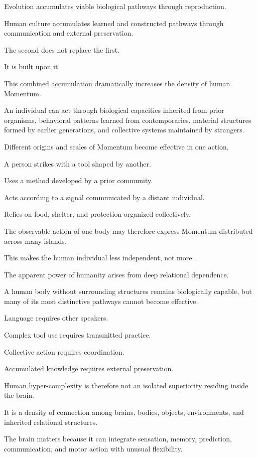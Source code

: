 Evolution accumulates viable biological pathways through reproduction.

Human culture accumulates learned and constructed pathways through communication and external preservation.

The second does not replace the first.

It is built upon it.

This combined accumulation dramatically increases the density of human Momentum.

An individual can act through biological capacities inherited from prior organisms, behavioral patterns learned from contemporaries, material structures formed by earlier generations, and collective systems maintained by strangers.

Different origins and scales of Momentum become effective in one action.

A person strikes with a tool shaped by another.

Uses a method developed by a prior community.

Acts according to a signal communicated by a distant individual.

Relies on food, shelter, and protection organized collectively.

The observable action of one body may therefore express Momentum distributed across many islands.

This makes the human individual less independent, not more.

The apparent power of humanity arises from deep relational dependence.

A human body without surrounding structures remains biologically capable, but many of its most distinctive pathways cannot become effective.

Language requires other speakers.

Complex tool use requires transmitted practice.

Collective action requires coordination.

Accumulated knowledge requires external preservation.

Human hyper-complexity is therefore not an isolated superiority residing inside the brain.

It is a density of connection among brains, bodies, objects, environments, and inherited relational structures.

The brain matters because it can integrate sensation, memory, prediction, communication, and motor action with unusual flexibility.

